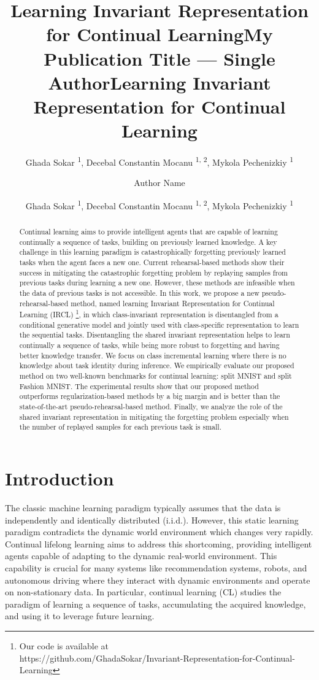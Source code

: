 \documentclass[letterpaper]{article} %
\title{Learning Invariant Representation for Continual Learning}
\author{
Ghada Sokar \textsuperscript{\rm 1},
Decebal Constantin Mocanu \textsuperscript{\rm 1, \rm 2},
Mykola Pechenizkiy \textsuperscript{\rm 1} \\
}
\title{My Publication Title --- Single Author}
\author {
Author Name \\
}
\title{Learning Invariant Representation for Continual Learning}
\author {
Ghada Sokar \textsuperscript{\rm 1},
Decebal Constantin Mocanu \textsuperscript{\rm 1, \rm 2},
Mykola Pechenizkiy \textsuperscript{\rm 1} \\
}
\begin{document}
\maketitle

\begin{abstract}
Continual learning aims to provide intelligent agents that are capable of learning continually a sequence of tasks, building on previously learned knowledge.
A key challenge in this learning paradigm is catastrophically forgetting previously learned tasks when the agent faces a new one. Current rehearsal-based methods show their success in mitigating the catastrophic forgetting problem by replaying samples from previous tasks during learning a new one. However, these methods are infeasible when the data of previous tasks is not accessible. In this work, we propose a new pseudo-rehearsal-based method, named learning Invariant Representation for Continual Learning (IRCL) \footnote{Our code is available at\\ https://github.com/GhadaSokar/Invariant-Representation-for-Continual-Learning}, in which class-invariant representation is disentangled from a conditional generative model and jointly used with class-specific representation to learn the sequential tasks. Disentangling the shared invariant representation helps to learn continually a sequence of tasks, while being more robust to forgetting and having better knowledge transfer. We focus on class incremental learning where there is no knowledge about task identity during inference. We empirically evaluate our proposed method on two well-known benchmarks for continual learning: split MNIST and split Fashion MNIST. The experimental results show that our proposed method outperforms regularization-based methods by a big margin and is better than the state-of-the-art pseudo-rehearsal-based method. Finally, we analyze the role of the shared invariant representation in mitigating the forgetting problem especially when the number of replayed samples for each previous task is small.
\end{abstract}

\section{Introduction}
The classic machine learning paradigm typically assumes that the data is independently and identically distributed (i.i.d.). However, this static learning paradigm contradicts the dynamic world environment which changes very rapidly. Continual lifelong learning aims to address this shortcoming, providing intelligent agents capable of adapting to the dynamic real-world environment. This capability is crucial for many systems like recommendation systems, robots, and autonomous driving where they interact with dynamic environments and operate on non-stationary data. In particular, continual learning (CL) studies the paradigm of learning a sequence of tasks, accumulating the acquired knowledge, and using it to leverage future learning.
\end{document}
